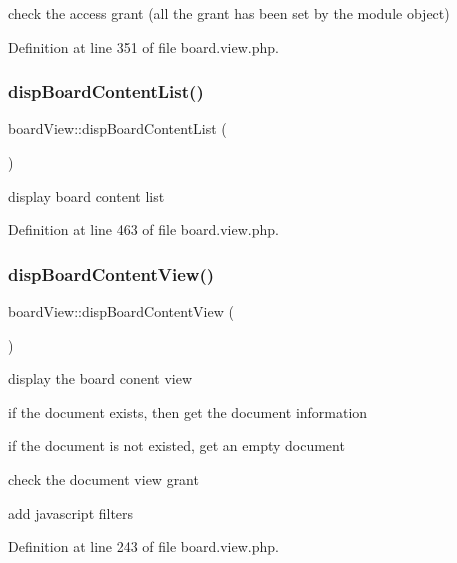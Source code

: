 check the access grant (all the grant has been set by the module object)

Definition at line 351 of file board.\+view.\+php.

\mbox{\label{classboardView_ae35d48f5a226160508dfacf1b3c2c249}} 
\subsubsection{\texorpdfstring{disp\+Board\+Content\+List()}{dispBoardContentList()}}
{\footnotesize\ttfamily board\+View\+::disp\+Board\+Content\+List (\begin{DoxyParamCaption}{ }\end{DoxyParamCaption})}



display board content list 



Definition at line 463 of file board.\+view.\+php.

\mbox{\label{classboardView_aac8ccefc2704d01636b70480d8dd58d7}} 
\subsubsection{\texorpdfstring{disp\+Board\+Content\+View()}{dispBoardContentView()}}
{\footnotesize\ttfamily board\+View\+::disp\+Board\+Content\+View (\begin{DoxyParamCaption}{ }\end{DoxyParamCaption})}



display the board conent view 

if the document exists, then get the document information

if the document is not existed, get an empty document

check the document view grant

add javascript filters

Definition at line 243 of file board.\+view.\+php.

\mbox{\label{classboardView_a21c4b3d619a379c091db504446ba16e1}} 
